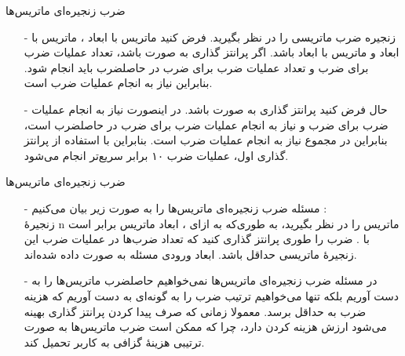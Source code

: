 \begin{frame}{‌ضرب زنجیره‌ای ماتریس‌ها}
\begin{itemize}\itemr
\item[-]
زنجیره ضرب ماتریسی
را در نظر بگیرید. فرض کنید ماتریس
با ابعاد
، ماتریس
با ابعاد
و ماتریس
با ابعاد
باشد. اگر پرانتز گذاری به صورت
باشد، تعداد
عملیات ضرب برای ضرب
و تعداد
عملیات ضرب برای ضرب
در حاصلضرب
باید انجام شود. بنابراین نیاز به انجام
عملیات ضرب است.
\item[-]
حال فرض کنید پرانتز گذاری به صورت
باشد. در اینصورت نیاز به انجام
عملیات ضرب برای ضرب
و نیاز به انجام 
عملیات ضرب
برای ضرب
در حاصلضرب 
است،
بنابراین در مجموع نیاز به انجام
عملیات ضرب است. بنابراین با استفاده از پرانتز گذاری اول، عملیات ضرب ۱۰ برابر سریع‌تر انجام می‌شود.
\end{itemize}
\end{frame}


\begin{frame}{‌ضرب زنجیره‌ای ماتریس‌ها}
\begin{itemize}\itemr
\item[-]
مسئله ضرب زنجیره‌ای ماتریس‌ها
را به صورت زیر بیان می‌کنیم :\\
زنجیرهٔ n ماتریس
را در نظر بگیرید، به طوری‌که به ازای
، ابعاد ماتریس
برابر است با
. ضرب
را طوری پرانتز گذاری کنید که تعداد ضرب‌ها در عملیات ضرب این زنجیرهٔ ماتریسی حداقل باشد. ابعاد ورودی مسئله به صورت
داده شده‌اند.
\item[-]
در مسئله ضرب زنجیره‌ای ماتریس‌ها نمی‌خواهیم حاصلضرب ماتریس‌ها را به دست آوریم بلکه تنها می‌خواهیم ترتیب ضرب را به گونه‌ای به دست آوریم که هزینه ضرب به حداقل برسد. معمولا زمانی که صرف پیدا کردن پرانتز گذاری بهینه می‌شود ارزش هزینه کردن دارد، چرا که ممکن است ضرب ماتریس‌ها به صورت ترتیبی هزینهٔ گزافی به کاربر تحمیل کند.
\end{itemize}
\end{frame}


